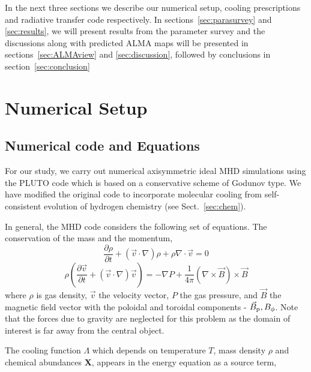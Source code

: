 \documentclass[useAMS,usenatbib]{mn2e}
\begin{document}
In the next three sections we describe our numerical setup, cooling
prescriptions and radiative transfer code respectively. In
sections~\ref{sec:parasurvey} and \ref{sec:results}, we will present results from the parameter survey and the
discussions along with predicted ALMA maps will be presented in
sections~\ref{sec:ALMAview} and \ref{sec:discussion}, followed by
conclusions in section~\ref{sec:conclusion}

\section{Numerical Setup}
\subsection{Numerical code and Equations}
For our study, we carry out numerical axisymmetric ideal MHD simulations using the PLUTO code \citep{Mignone:2007p644} which is based on a conservative scheme of Godunov type.
We have modified the original code to incorporate molecular cooling
from self-consistent evolution of hydrogen chemistry (see Sect.~\ref{sec:chem}).

  
In general, the MHD code considers the following set of equations.
The conservation of the mass and the momentum,
%
\begin{equation}\label{masscons}
\frac{\partial \rho}{\partial t} + (\vec{v} \cdot \nabla)\rho  +
\rho \nabla \cdot \vec{v} = 0
\end{equation}
%
\begin{equation}\label{momcons}
\rho(\frac{\partial \vec{v}}{\partial t} +
(\vec{v} \cdot \nabla) \vec{v}) =
- \nabla P + \frac{1}{4\pi} (\nabla \times \vec{B}) \times \vec{B}
\end{equation}
%
where $\rho$ is gas density, $\vec{v}$ the velocity vector, $P$ the gas pressure,
and $\vec{B}$ the magnetic field vector with the poloidal and toroidal
components - $\vec{B}_{\rm p}, {B}_{\phi}$. Note that the forces due
to gravity are neglected for this problem as the domain of interest is
far away from the central object.  
%

The cooling function $\Lambda$ which depends on temperature $T$, mass density $\rho$ and
chemical abundances {\bf{X}}, appears in the
energy equation as a source term,
\end{document}
